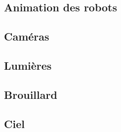 \subsection{Animation des robots}
\subsection{Caméras}
\subsection{Lumières}
\subsection{Brouillard}
\subsection{Ciel}

